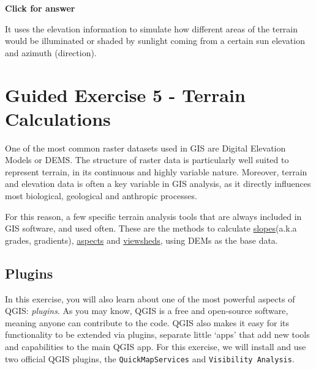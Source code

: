 \documentclass[
  letterpaper,
  DIV=11,
  numbers=noendperiod]{scrreprt}
\begin{document}
\begin{tcolorbox}[enhanced jigsaw, leftrule=.75mm, colframe=quarto-callout-important-color-frame, breakable, toprule=.15mm, bottomrule=.15mm, arc=.35mm, rightrule=.15mm, opacityback=0, colback=white, left=2mm]

\vspace{-3mm}\textbf{Click for answer}\vspace{3mm}

It uses the elevation information to simulate how different areas of the
terrain would be illuminated or shaded by sunlight coming from a certain
sun elevation and azimuth (direction).

\end{tcolorbox}

\section{Guided Exercise 5 - Terrain
Calculations}\label{guided-exercise-5---terrain-calculations}

One of the most common raster datasets used in GIS are Digital Elevation
Models or DEMS. The structure of raster data is particularly well suited
to represent terrain, in its continuous and highly variable nature.
Moreover, terrain and elevation data is often a key variable in GIS
analysis, as it directly influences most biological, geological and
anthropic processes.

For this reason, a few specific terrain analysis tools that are always
included in GIS software, and used often. These are the methods to
calculate
\href{https://en.wikipedia.org/wiki/Grade_(slope)}{slopes}(a.k.a grades,
gradients),
\href{https://en.wikipedia.org/wiki/Aspect_(geography)}{aspects} and
\href{https://en.wikipedia.org/wiki/Viewshed}{viewsheds}, using DEMs as
the base data.

\subsection{Plugins}\label{plugins}

In this exercise, you will also learn about one of the most powerful
aspects of QGIS: \emph{plugins}. As you may know, QGIS is a free and
open-source software, meaning anyone can contribute to the code. QGIS
also makes it easy for its functionality to be extended via plugins,
separate little `apps' that add new tools and capabilities to the main
QGIS app. For this exercise, we will install and use two official QGIS
plugins, the \texttt{QuickMapServices} and
\texttt{Visibility\ Analysis}.
\end{document}
